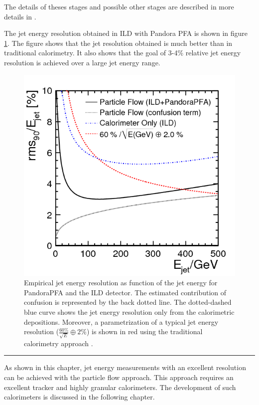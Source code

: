 The details of theses stages and possible other stages are described in more details in \cite{Thomson:2009rp}.

The jet energy resolution obtained in ILD with Pandora PFA is shown in figure \ref{fig:ILDPFA}. The figure shows that the jet resolution obtained is much better than in traditional calorimetry. It also shows that the goal of 3-4\% relative jet energy resolution is achieved over a large jet energy range.

\begin{figure}[htbp!]
  \centering
  \includegraphics[width=0.6\linewidth]{chap2/fig/pfa_figure_10.png}
  \caption{Empirical jet energy resolution as function of the jet energy for PandoraPFA and the ILD detector. The estimated contribution of confusion is represented by the back dotted line. The dotted-dashed blue curve shows the jet energy resolution only from the calorimetric depositions. Moreover, a parametrization of a typical jet energy resolution ($\frac{60\%}{\sqrt{E}} \oplus 2\%$) is shown in red using the traditional calorimetry approach \cite{Thomson:2009rp}.} \label{fig:ILDPFA}
\end{figure}

\begin{center}
  \rule{0.5\textwidth}{.4pt}
\end{center}

As shown in this chapter, jet energy measurements with an excellent resolution can be achieved with the particle flow approach. This approach requires an excellent tracker and highly granular calorimeters. The development of such calorimeters is discussed in the following chapter.
